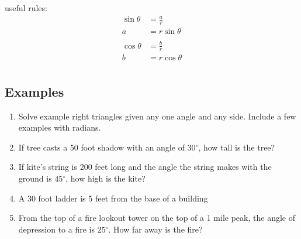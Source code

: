 \documentclass{exam}
\newcommand{\dg}{\ensuremath{^\circ}}
\begin{document}
  useful rules:
  \begin{align*}
    \sin \theta & = \frac{a}{r} \\
    a           & = r \sin \theta \\
    \\
    \cos \theta & = \frac{b}{r} \\
    b           & = r \cos \theta \\
  \end{align*}

  \subsection{Examples}

  \begin{enumerate}
    \item Solve example right triangles given any one angle and any side.  Include a few examples with radians.

    \item If tree casts a 50 foot shadow with an angle of $30 \dg$, how tall is the tree?

    \item If kite's string is 200 feet long and the angle the string makes with the ground is $45 \dg$, how high is the
      kite?

    \item A 30 foot ladder is 5 feet from the base of a building

    \item From the top of a fire lookout tower on the top of a 1 mile peak, the angle of depression to a fire is
      $25 \dg$.  How far away is the fire?

  \end{enumerate}
\end{document}
